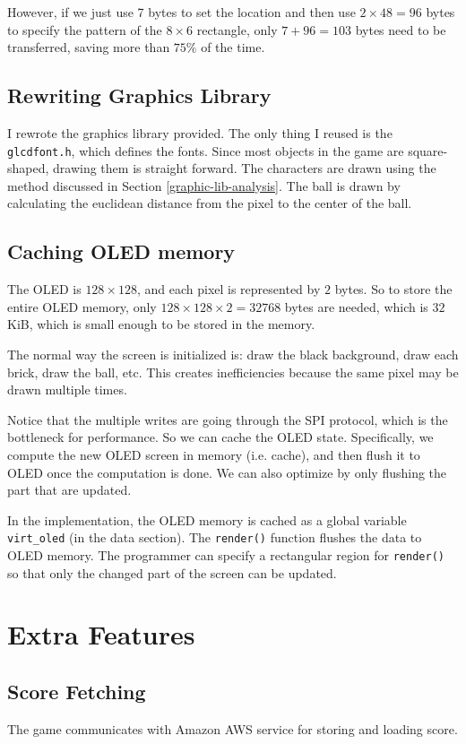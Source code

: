 \documentclass[conference]{IEEEtran}
\begin{document}
However, if we just use 7 bytes to set the location and then use
 $2 \times 48 = 96$ bytes to specify the pattern of the $8 \times 6$ rectangle,
 only $7 + 96 = 103$ bytes need to be transferred, saving more than $75\%$ of
 the time. 

\subsection{Rewriting Graphics Library}
I rewrote the graphics library provided. The only thing I reused is the
 \lstinline{glcdfont.h}, which defines the fonts. Since most objects in the 
 game are square-shaped, drawing them is straight forward. The characters are
 drawn using the method discussed in Section \ref{graphic-lib-analysis}. The
 ball is drawn by calculating the euclidean distance from the pixel to the
 center of the ball.

\subsection{Caching OLED memory}
The OLED is $128 \times 128$, and each pixel is represented by $2$ bytes.
 So to store the entire OLED memory, only $128 \times 128 \times 2 = 32768$
 bytes are needed, which is $32$ KiB, which is small enough to be stored
 in the memory.

The normal way the screen is initialized is: draw the black background, draw
 each brick, draw the ball, etc. This creates inefficiencies because the same
 pixel may be drawn multiple times.

Notice that the multiple writes are going through the SPI protocol, which is
 the bottleneck for performance. So we can cache the OLED state. Specifically,
 we compute the new OLED screen in memory (i.e. cache), and then flush it to
 OLED once the computation is done. We can also optimize by only flushing the
 part that are updated.

In the implementation, the OLED memory is cached as a global variable
 \lstinline{virt_oled} (in the data section). The \lstinline{render()} function
 flushes the data to OLED memory. The programmer can specify a rectangular
 region for \lstinline{render()} so that only the changed part of the screen can
 be updated.

\section{Extra Features}

\subsection{Score Fetching}
The game communicates with Amazon AWS service for storing and loading score.
\end{document}
